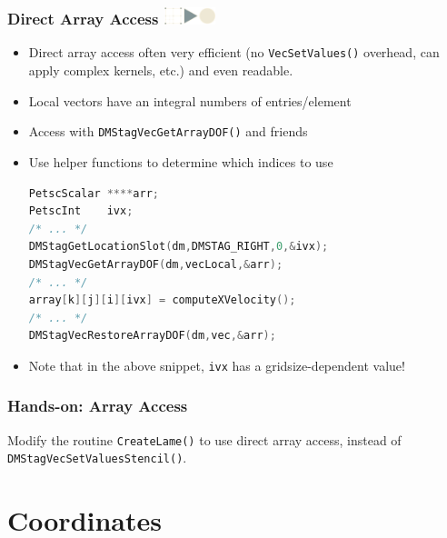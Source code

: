 \documentclass{beamer}
\newcommand\frametitlelogo[1]{\frametitle{#1\hspace{0pt plus 1 filll} \includegraphics[width=42pt]{logo_slides}}}
\begin{document}
\begin{frame}[fragile]
\frametitlelogo{Direct Array Access}
\begin{itemize}
  \item Direct array access often very efficient (no \lstinline{VecSetValues()} overhead, can apply complex kernels, etc.) and even readable.
\item Local vectors have an integral numbers of entries/element
\item Access with \lstinline{DMStagVecGetArrayDOF()} and friends
\item Use helper functions to determine which indices to use
  \begin{lstlisting}[language=C,basicstyle=\scriptsize\ttfamily]
PetscScalar ****arr;
PetscInt    ivx;
/* ... */
DMStagGetLocationSlot(dm,DMSTAG_RIGHT,0,&ivx);
DMStagVecGetArrayDOF(dm,vecLocal,&arr);
/* ... */
array[k][j][i][ivx] = computeXVelocity();
/* ... */
DMStagVecRestoreArrayDOF(dm,vec,&arr);
\end{lstlisting}
\item Note that in the above snippet, \lstinline{ivx} has a gridsize-dependent value!
\end{itemize}
\end{frame}

\begin{frame}[fragile]
  \frametitle{Hands-on: Array Access}
  Modify the routine \lstinline{CreateLame()} to use direct array access, instead
  of \lstinline{DMStagVecSetValuesStencil()}.
\end{frame}

\section{Coordinates}
\end{document}
